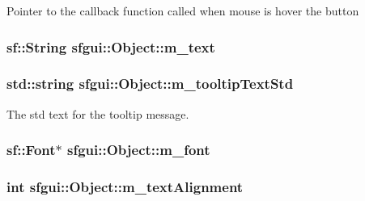 Pointer to the callback function called when mouse is hover the button \hypertarget{classsfgui_1_1Object_b63c033215c2f6f1d64645e3c6f0153b}{
\subsubsection[m\_\-text]{\setlength{\rightskip}{0pt plus 5cm}sf::String {\bf sfgui::Object::m\_\-text}}}
\label{classsfgui_1_1Object_b63c033215c2f6f1d64645e3c6f0153b}


\hypertarget{classsfgui_1_1Object_d54c76d28fac3a92b8b97f1758a75685}{
\subsubsection[m\_\-tooltipTextStd]{\setlength{\rightskip}{0pt plus 5cm}std::string {\bf sfgui::Object::m\_\-tooltipTextStd}}}
\label{classsfgui_1_1Object_d54c76d28fac3a92b8b97f1758a75685}


The std text for the tooltip message. 

\hypertarget{classsfgui_1_1Object_20ec4624e3d9b8e3cebeb71ec97fd104}{
\subsubsection[m\_\-font]{\setlength{\rightskip}{0pt plus 5cm}sf::Font$\ast$ {\bf sfgui::Object::m\_\-font}}}
\label{classsfgui_1_1Object_20ec4624e3d9b8e3cebeb71ec97fd104}


\hypertarget{classsfgui_1_1Object_7cfb56995f2140319df705fb1b146d36}{
\subsubsection[m\_\-textAlignment]{\setlength{\rightskip}{0pt plus 5cm}int {\bf sfgui::Object::m\_\-textAlignment}}}
\label{classsfgui_1_1Object_7cfb56995f2140319df705fb1b146d36}


